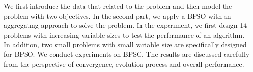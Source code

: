 We first introduce the data that related to the problem and then model the problem with two objectives. In the second part, we apply a BPSO with 
an aggregating approach to solve the problem. In the experiment, we first design 14 problems with increasing variable sizes 
to test the performance of an algorithm. In addition, two small problems with small variable size are specifically designed for BPSO. 
We conduct experiments on BPSO. The results are discussed carefully from the perspective of convergence, evolution process and overall performance.
% 
% 
% 
% 
% 


